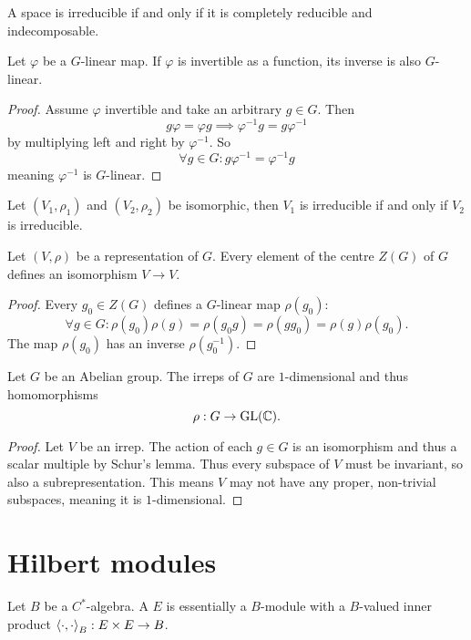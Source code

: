 A space is irreducible if and only if it is completely reducible and indecomposable.

\begin{proposition}
Let $\varphi$ be a $G$-linear map. If $\varphi$ is invertible as a function, its inverse is also $G$-linear.
\end{proposition}
\begin{proof}
Assume $\varphi$ invertible and take an arbitrary $g\in G$. Then
\[ g\varphi = \varphi g \implies \varphi^{-1} g = g \varphi^{-1} \]
by multiplying left and right by $\varphi^{-1}$. So
\[ \forall g\in G: g \varphi^{-1} = \varphi^{-1} g \]
meaning $\varphi^{-1}$ is $G$-linear.
\end{proof}

\begin{proposition}
Let $(V_1,\rho_1)$ and $(V_2,\rho_2)$ be isomorphic, then $V_1$ is irreducible \textup{if and only if} $V_2$ is irreducible.
\end{proposition}

\begin{proposition}
Let $(V,\rho)$ be a representation of $G$. Every element of the centre $Z(G)$ of $G$ defines an isomorphism $V\to V$.
\end{proposition}
\begin{proof}
Every $g_0\in Z(G)$ defines a $G$-linear map $\rho(g_0)$:
\[ \forall g\in G: \rho(g_0)\rho(g) = \rho(g_0g) = \rho(gg_0) = \rho(g) \rho(g_0). \]
The map $\rho(g_0)$ has an inverse $\rho(g_0^{-1})$.
\end{proof}

\begin{proposition}
Let $G$ be an Abelian group. The irreps of $G$ are $1$-dimensional and thus homomorphisms
\[ \rho: G\to \operatorname{GL}(\mathbb{C}). \]
\end{proposition}
\begin{proof}
Let $V$ be an irrep. The action of each $g\in G$ is an isomorphism and thus a scalar multiple by Schur's lemma. Thus every subspace of $V$ must be invariant, so also a subrepresentation. This means $V$ may not have any proper, non-trivial subspaces, meaning it is $1$-dimensional.
\end{proof}

\section{Hilbert modules}
Let $B$ be a $C^*$-algebra. A  $E$ is essentially a $B$-module with a $B$-valued inner product $\left\langle \cdot, \cdot \right\rangle_B: E\times E \to B$.

